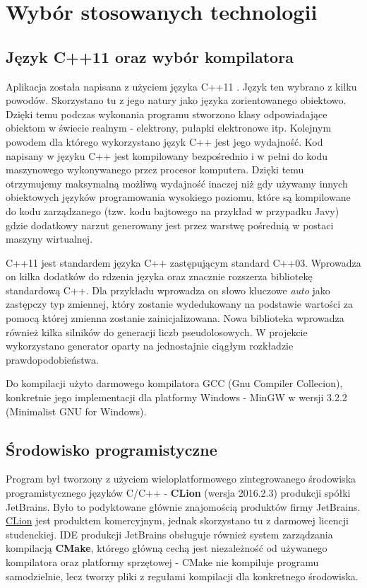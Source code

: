 \chapter{Wybór stosowanych technologii}
\section{Język C++11 oraz wybór kompilatora}
Aplikacja została napisana z użyciem języka C++11 \cite{c++}. Język ten
wybrano z kilku powodów. Skorzystano tu z jego natury jako języka zorientowanego obiektowo. Dzięki temu podczas wykonania programu stworzono klasy odpowiadające obiektom w świecie realnym - elektrony, pułapki elektronowe itp.
Kolejnym powodem dla którego wykorzystano język C++ jest jego wydajność. Kod napisany
w języku C++ jest kompilowany bezpośrednio i w pełni do kodu maszynowego  wykonywanego przez procesor komputera. Dzięki temu
otrzymujemy maksymalną możliwą wydajność inaczej niż gdy używamy innych
obiektowych języków programowania wysokiego poziomu, które są kompilowane do kodu
zarządzanego (tzw. kodu bajtowego na przykład w przypadku Javy) gdzie dodatkowy narzut
generowany jest przez warstwę pośrednią w postaci maszyny wirtualnej. 

C++11 jest standardem języka C++ zastępującym standard C++03. Wprowadza on kilka dodatków do rdzenia języka oraz znacznie rozszerza bibliotekę standardową C++. Dla przykładu wprowadza on słowo kluczowe \textit{auto} jako zastępczy typ zmiennej, który zostanie wydedukowany na podstawie wartości za pomocą której zmienna zostanie zainicjalizowana. Nowa biblioteka wprowadza również kilka silników do generacji liczb pseudolosowych. W projekcie wykorzystano generator oparty na jednostajnie ciągłym rozkładzie prawdopodobieństwa.

Do kompilacji użyto darmowego kompilatora GCC (Gnu Compiler Collecion), konkretnie jego implementacji dla platformy Windows - MinGW w wersji 3.2.2 (Minimalist GNU for Windows).

\section{Środowisko programistyczne}

Program był tworzony z użyciem wieloplatformowego zintegrowanego środowiska programistycznego języków C/C++ - \textbf{CLion} (wersja 2016.2.3) produkcji spółki JetBrains. Było to podyktowane głównie znajomością produktów firmy JetBrains. \href{https://www.jetbrains.com/clion/}{CLion} jest produktem komercyjnym, jednak skorzystano tu z darmowej licencji studenckiej. IDE produkcji JetBrains obsługuje również 	system zarządzania kompilacją \textbf{CMake}, którego główną cechą jest niezależność od używanego kompilatora oraz platformy sprzętowej - CMake nie kompiluje programu samodzielnie, lecz tworzy pliki z regułami kompilacji dla konkretnego środowiska.

